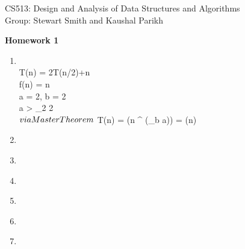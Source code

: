 \documentclass[11pt]{article}
\begin{document}

\noindent CS513: Design and Analysis of Data Structures and Algorithms \\
        Group: Stewart Smith and Kaushal Parikh\\

        \begin{center}
        \LARGE{\textbf{Homework 1}}\\
            \end{center}

            \vspace{.1in}


            \begin{enumerate}

            \item \\
                T(n) = 2T(n/2)+\log n \\
                f(n) = \log n \\
                a = 2, b = 2 \\
                a > \log _2 2 \\
                $ via Master Theorem \\$
                T(n) = \Theta(n ^ {(\log _b a)}) = \Theta(n)\\
            \item \\
            \item \\
            \item \\
            \item \\
            \item \\
            \item \\
            
            \end{enumerate}

                                
\end{document}
